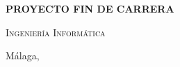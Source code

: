 \begin{titlepage}
  \bigskip
  
  \begin{center}\Large\textbf{\textsf{PROYECTO FIN DE CARRERA}}\end{center}
  
  \medskip
  
  \begin{center}
    \Huge
    \sffamily\scshape
    \pfctitlename   
  \end{center}
  
  \medskip
  
  \begin{center}
    \Huge
    \scshape%
    \textsf{Ingeniería Informática}
  \end{center}
  
  \vfill
  
  {\large Málaga, \pfcanno \hfill \pfcauthorname}
\end{titlepage}
